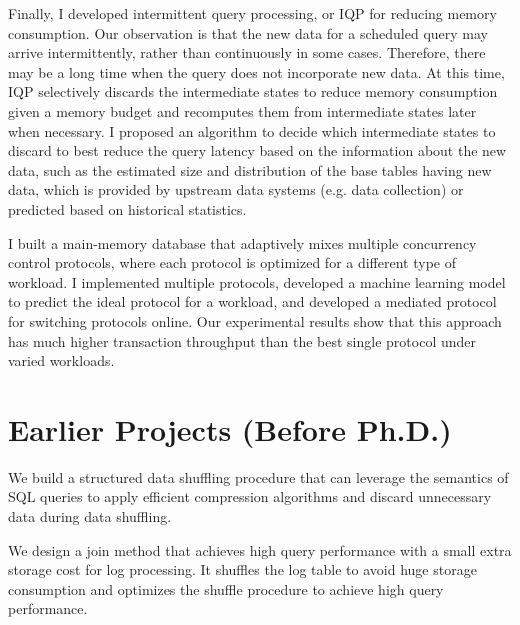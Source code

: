 \documentclass[10pt]{article} %
\newcommand{\iqp}{IQP\xspace}
\begin{document}
{Finally, I developed intermittent query processing, 
or \iqp for reducing memory consumption. 
Our observation is that the new data for a scheduled query 
may arrive intermittently, rather than continuously in some cases. 
Therefore, there may be a long time when the query does not  
incorporate new data. At this time, 
\iqp selectively discards the intermediate 
states to reduce memory consumption given a memory budget 
and recomputes them from intermediate states later when necessary. 
I proposed an algorithm to decide which intermediate states 
to discard to best reduce the query latency 
based on the information about the new data, 
such as the estimated size and 
distribution of the base tables having new data, 
which is provided by upstream data systems 
(e.g. data collection) or predicted based on historical statistics.}

{I built a main-memory database that adaptively mixes 
multiple concurrency control protocols, where each protocol is optimized for 
a different type of workload. I implemented multiple protocols, developed a machine learning model to 
predict the ideal protocol for a workload, and developed a mediated protocol for switching protocols online. 
Our experimental results show that this approach has much higher transaction throughput than 
the best single protocol under varied workloads. }

\section{Earlier Projects (Before Ph.D.)}
{We build a structured data shuffling procedure that can leverage the semantics of SQL queries to apply efficient compression algorithms 
and discard unnecessary data during data shuffling.}

{We design a join method that achieves high query performance with a small extra storage cost for log processing. 
It shuffles the log table to avoid huge storage consumption and optimizes the shuffle procedure to achieve high query performance.}

\vspace{-5mm}


\end{document}
